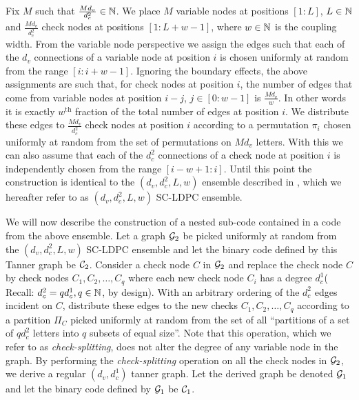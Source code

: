 Fix $M$ such that $\frac{Md_{v}}{d_{c}^{2}}\in \mathbb{N}$. We place $M$ variable nodes at positions $[1: L]$, $L\in\mathbb{N}$ and $\frac{Md_{v}}{d_{c}^{2}}$ check nodes at positions $[1 : L+w-1]$, where $w\in \mathbb{N}$ is the coupling width. From the variable node perspective we assign the edges such that each of the $d_{v}$ connections of a variable node at position $i$ is chosen uniformly at random from the range $[i : i+w-1]$. Ignoring the boundary effects, the above assignments are such that, for check nodes  at position $i$, the number of edges that come from variable nodes at position $i-j$, $j\in[0:w-1]$ is $\frac{Md_{v}}{w}$. In other words it is exactly $w^{\text{th}}$ fraction of the total number of edges at position $i$. We distribute these edges to $\frac{Md_{v}}{d_{c}^{2}}$ check nodes at position $i$ according to a permutation $\pi_{i}$ chosen uniformly at random from the set of permutations on $Md_{v}$ letters. With this we can also assume that each of the $d_{c}^{2}$ connections of a check node at position $i$ is independently chosen from the range $[i-w+1 : i]$. Until this point the construction is identical to the $(d_{v},d_{c}^{2},L,w)$ ensemble described in \cite{KudekarUrbanke11}, which we hereafter refer to as $(d_{v},d_{c}^{2},L,w)$ SC-LDPC ensemble. 

We will now describe the construction of a nested sub-code contained in a code from the above ensemble. Let a graph $\mathcal{G}_{2}$ be picked uniformly at random from the  $(d_{v},d_{c}^{2},L,w)$ SC-LDPC ensemble and let the binary code defined by this Tanner graph be $\mathcal{C}_{2}$. Consider a check node $C$ in $\mathcal{G}_{2}$ and
replace the check node $C$ by check nodes $C_{1}, C_{2}, \ldots, C_{q}$ where each new check node $C_{i}$ has a degree $d_{c}^{1}$( Recall: $d_{c}^{2}=q d_{c}^{1},q\in \mathbb{N}$, by design). With an arbitrary ordering of the $d_{c}^{2}$ edges incident on $C$, distribute these edges to the new checks $C_{1}, C_{2}, \ldots, C_{q}$ according to a partition $\Pi_{C}$ picked uniformly at random from the set of all ``partitions of a set of $qd_{c}^{2}$ letters into $q$ subsets of equal size''. 
Note that this operation, which we refer to as \textit{check-splitting}, does not alter the degree of  any variable node in the graph. By performing the \textit{check-splitting} operation on all the check nodes in $\mathcal{G}_{2}$, we derive a regular $(d_{v},d_{c}^{1})$ tanner graph. Let the derived graph be denoted $\mathcal{G}_{1}$ and let the binary code defined by $\mathcal{G}_{1}$ be $\mathcal{C}_{1}$.

